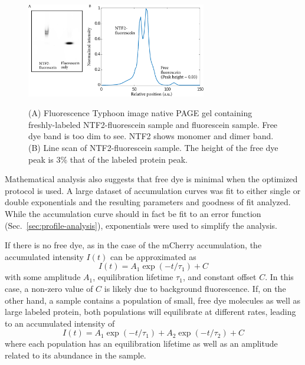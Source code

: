\begin{figure} %
\caption[Quantifying free dye concentration.]{(A) Fluorescence Typhoon image native PAGE gel containing freshly-labeled NTF2-fluorescein sample and fluorescein sample.  Free dye band is too dim to see. NTF2 shows monomer and dimer band.  (B) Line scan of NTF2-fluorescein sample.  The height of the free dye peak is 3\% that of the labeled protein peak.\\}
\centering
\includegraphics[width=0.7\textwidth]{figs/ch03/free-dye-typhoon}
\label{fig:free-dye-typhoon}
\end{figure} 

Mathematical analysis also suggests that free dye is minimal when the optimized protocol is used.  A large dataset of accumulation curves was fit to either single or double exponentials and the resulting parameters and goodness of fit analyzed.  While the accumulation curve should in fact be fit to an error function (Sec.~\ref{sec:profile-analysis}), exponentials were used to simplify the analysis.

If there is no free dye, as in the case of the mCherry accumulation, the accumulated intensity $I(t)$ can be approximated as
\begin{equation}
I(t) = A_1\exp(-t/\tau_1) +C
\label{eq:single-exp}
\end{equation}
with some amplitude $A_1$, equilibration lifetime $\tau_1$, and constant offset $C$.  In this case, a non-zero value of $C$ is likely due to background fluorescence.  If, on the other hand, a sample contains a population of small, free dye molecules as well as large labeled protein, both populations will equilibrate at different rates, leading to an accumulated intensity of
\begin{equation}
I(t) = A_1\exp(-t/\tau_1) + A_2\exp(-t/\tau_2)+C
\label{eq:double-exp}
\end{equation}
where each population has an equilibration lifetime as well as an amplitude related to its abundance in the sample.

